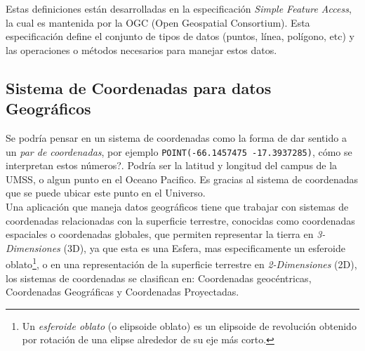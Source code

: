 

    Estas definiciones están desarrolladas en la especificación \emph{Simple Feature Access}, la cual es mantenida por la OGC (Open Geospatial Consortium). Esta especificación define el conjunto de tipos de datos (puntos, línea, polígono, etc) y las operaciones o métodos necesarios para manejar estos datos. \cite[p. 8--11]{simpleFeatureAccess}


  \subsection{Sistema de Coordenadas para datos Geográficos} %
  \label{sec:sistema_de_coordenadas_para_datos_geograficos}
    Se podría pensar en un sistema de coordenadas como la forma de dar sentido a un \emph{par de coordenadas}, por ejemplo \verb|POINT(-66.1457475 -17.3937285)|, cómo se interpretan estos números?.
    Podría ser la latitud y longitud del campus de la UMSS, o algun punto en el Oceano Pacifico. Es gracias al sistema de coordenadas que se puede ubicar este punto en el Universo.\\


    Una aplicación que maneja datos geográficos tiene que trabajar con sistemas de coordenadas relacionadas con la superficie terrestre, conocidas como coordenadas espaciales o coordenadas globales, que permiten representar la tierra en \emph{3-Dimensiones} (3D), ya que esta es una Esfera, mas especificamente un esferoide oblato\footnote{Un \emph{esferoide oblato} (o elipsoide oblato) es un elipsoide de revolución obtenido por rotación de una elipse alrededor de su eje más corto.}, o en una representación de la superficie terrestre en \emph{2-Dimensiones} (2D), los sistemas de coordenadas se clasifican en: Coordenadas geocéntricas, Coordenadas Geográficas y Coordenadas Proyectadas. \cite{danielAzuma}

